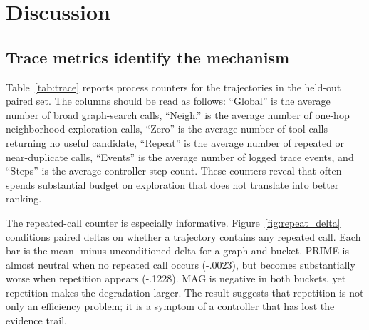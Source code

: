\section{Discussion}


\subsection{Trace metrics identify the mechanism}
Table~\ref{tab:trace} reports process counters for the \tb trajectories in the held-out paired set. The columns should be read as follows: ``Global'' is the average number of broad graph-search calls, ``Neigh.'' is the average number of one-hop neighborhood exploration calls, ``Zero'' is the average number of tool calls returning no useful candidate, ``Repeat'' is the average number of repeated or near-duplicate calls, ``Events'' is the average number of logged trace events, and ``Steps'' is the average controller step count. These counters reveal that \tb often spends substantial budget on exploration that does not translate into better ranking.

\begin{table}[t]
\centering
\caption{\textbf{Trace counters for \tb on held-out paired examples.} All entries are per-query averages. Higher values are not inherently better, they only indicate more interaction budget consumed before final ranking.}
\label{tab:trace}
\end{table}

The repeated-call counter is especially informative. Figure~\ref{fig:repeat_delta} conditions paired \mrr deltas on whether a \tb trajectory contains any repeated call. Each bar is the mean \tb-minus-unconditioned \mrr delta for a graph and bucket. PRIME is almost neutral when no repeated call occurs (-.0023), but becomes substantially worse when repetition appears (-.1228). MAG is negative in both buckets, yet repetition makes the degradation larger. The result suggests that repetition is not only an efficiency problem; it is a symptom of a controller that has lost the evidence trail.

